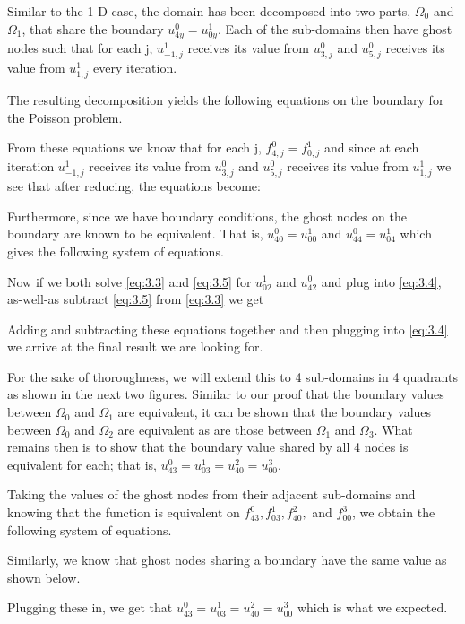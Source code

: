 

Similar to the 1-D case, the domain has been decomposed into two parts, $\Omega_0$ and $\Omega_1$, that share the boundary $u_{4y}^0 = u_{0y}^1$. Each of the sub-domains then have ghost nodes such that for each j, $u_{-1,j}^1$ receives its value from $u_{3,j}^0$ and $u_{5,j}^0$ receives its value from $u_{1,j}^1$ every iteration.


\pagebreak
The resulting decomposition yields the following equations on the boundary for the Poisson problem.


From these equations we know that for each j, $f_{4,j}^0 = f_{0,j}^1$ and since at each iteration $u_{-1,j}^1$ receives its value from $u_{3,j}^0$ and $u_{5,j}^0$ receives its value from $u_{1,j}^1$ we see that after reducing, the equations become:


Furthermore, since we have boundary conditions, the ghost nodes on the boundary are known to be equivalent. That is, $u_{40}^0 = u_{00}^1$ and $u_{44}^0 = u_{04}^1$ which gives the following system of equations.


Now if we both solve \ref{eq:3.3} and \ref{eq:3.5} for $u_{02}^1$ and $u_{42}^0$ and plug into \ref{eq:3.4}, as-well-as subtract \ref{eq:3.5} from \ref{eq:3.3} we get


Adding and subtracting these equations together and then plugging into \ref{eq:3.4} we arrive at the final result we are looking for. 


For the sake of thoroughness, we will extend this to 4 sub-domains in 4 quadrants as shown in the next two figures. Similar to our proof that the boundary values between $\Omega_0$ and $\Omega_1$ are equivalent, it can be shown that the boundary values between $\Omega_0$ and $\Omega_2$ are equivalent as are those between $\Omega_1$ and $\Omega_3$. What remains then is to show that the boundary value shared by all 4 nodes is equivalent for each; that is, $u_{43}^0 = u_{03}^1 = u_{40}^2 = u_{00}^3$.



\pagebreak
Taking the values of the ghost nodes from their adjacent sub-domains and knowing that the function is equivalent on $f_{43}^0, f_{03}^1, f_{40}^2,$ and $f_{00}^3$, we obtain the following system of equations.


Similarly, we know that ghost nodes sharing a boundary have the same value as shown below.


Plugging these in, we get that $u_{43}^0 = u_{03}^1 = u_{40}^2 = u_{00}^3$ which is what we expected.





